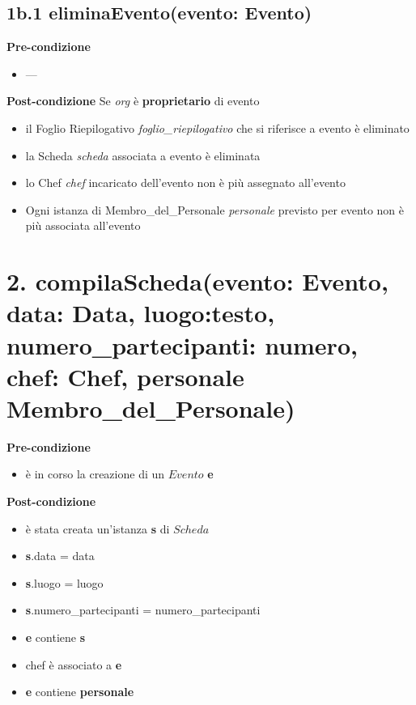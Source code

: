 \documentclass[12pt]{extarticle}
\begin{document}
\subsection*{1b.1 eliminaEvento(evento: Evento)}

\textbf{Pre-condizione}
\begin{itemize}
  \item ---
\end{itemize}
\textbf{Post-condizione} Se \textit{org} è \textbf{proprietario} di evento
\begin{itemize}
  \item il Foglio Riepilogativo \textit{foglio\_riepilogativo} che si riferisce a evento è eliminato
  \item la Scheda \textit{scheda} associata a evento è eliminata
  \item lo Chef \textit{chef} incaricato dell'evento non è più assegnato all'evento
  \item Ogni istanza di Membro\_del\_Personale \textit{personale} previsto per evento non è più associata all'evento
\end{itemize}


\section*{2. compilaScheda(evento: Evento, data: Data, luogo:testo, numero\_partecipanti: numero, chef: Chef, personale Membro\_del\_Personale)}

\textbf{Pre-condizione}
\begin{itemize}
  \item è in corso la creazione di un $Evento$ \textbf{e}
\end{itemize} 
\textbf{Post-condizione} 
\begin{itemize}
  \item è stata creata un'istanza \textbf{s} di $Scheda$
  \item \textbf{s}.data = data
  \item \textbf{s}.luogo = luogo
  \item \textbf{s}.numero\_partecipanti = numero\_partecipanti
  \item \textbf{e} contiene \textbf{s}
  \item chef è associato a \textbf{e}
  \item \textbf{e} contiene \textbf{personale}
\end{itemize}
\end{document}
